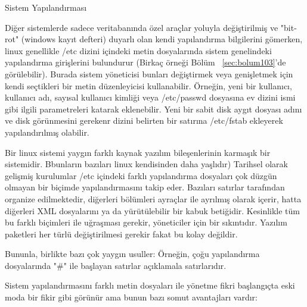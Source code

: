 \begin{section}{Sistem Yapılandırması}

Diğer sistemlerde sadece veritabanında özel araçlar yoluyla değiştirilmiş ve "bit-rot" (windows kayıt defteri) duyarlı  olan  kendi yapılandırma bilgilerini gömerken,  linux genellikle /etc dizini içindeki metin dosyalarında sistem genelindeki yapılandırma girişlerini bulundurur (Birkaç örneği Bölüm ~\ref{sec:bolum103}'de görülebilir). Burada sistem yöneticisi bunları değiştirmek veya genişletmek için kendi seçtikleri bir metin düzenleyicisi kullanabilir. Örneğin, yeni bir kullanıcı, kullanıcı adı, sayısal kullanıcı kimliği veya /etc/passwd dosyasına ev dizini ismi gibi ilgili parametreleri katarak eklenebilir. Yeni bir sabit disk aygıt dosyası adını ve disk görünmesini gerekenr dizini belirten bir satırına /etc/fstab ekleyerek yapılandırılmış olabilir.

Bir linux sistemi yaygın farklı kaynak yazılım bileşenlerinin karmaşık bir sistemidir. Bbunların bazıları linux kendisinden daha yaşlıdır) Tarihsel olarak gelişmiş kurulumlar  /etc içindeki farklı yapılandırma dosyaları çok düzgün olmayan bir biçimde yapılandırmasını takip eder. Bazıları satırlar tarafından organize edilmektedir, diğerleri bölümleri ayraçlar ile ayrılmış olarak içerir, hatta diğerleri XML dosyalarını ya da yürütülebilir bir kabuk betiğidir. Kesinlikle tüm bu farklı biçimleri ile uğraşması gerekir, yöneticiler  için bir sıkıntıdır. Yazılım paketleri her türlü değiştirilmesi gerekir fakat bu kolay değildir.

Bununla, birlikte bazı çok yaygın usuller: Örneğin, çoğu yapılandırma dosyalarında "\#" ile başlayan satırlar açıklamala satırlarıdır.

Sistem yapılandırmasını farklı metin dosyaları ile yönetme fikri  başlangıçta eski moda bir fikir gibi görünür ama bunun bazı somut avantajları vardır:


\end{section}
